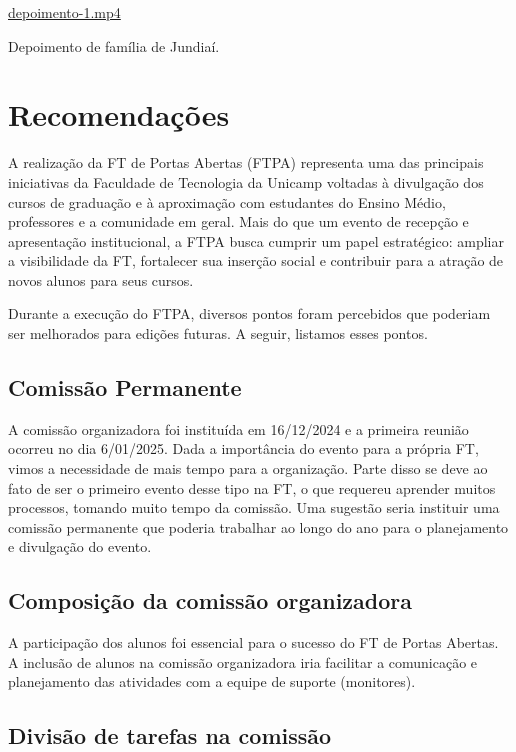 \documentclass[
  letterpaper,
  DIV=11,
  numbers=noendperiod]{scrreprt}
\begin{document}
\url{depoimento-1.mp4}

Depoimento de família de Jundiaí.


\chapter{Recomendações}\label{recomendauxe7uxf5es}

A realização da FT de Portas Abertas (FTPA) representa uma das
principais iniciativas da Faculdade de Tecnologia da Unicamp voltadas à
divulgação dos cursos de graduação e à aproximação com estudantes do
Ensino Médio, professores e a comunidade em geral. Mais do que um evento
de recepção e apresentação institucional, a FTPA busca cumprir um papel
estratégico: ampliar a visibilidade da FT, fortalecer sua inserção
social e contribuir para a atração de novos alunos para seus cursos.

Durante a execução do FTPA, diversos pontos foram percebidos que
poderiam ser melhorados para edições futuras. A seguir, listamos esses
pontos.

\section{Comissão Permanente}\label{comissuxe3o-permanente}

A comissão organizadora foi instituída em 16/12/2024 e a primeira
reunião ocorreu no dia 6/01/2025. Dada a importância do evento para a
própria FT, vimos a necessidade de mais tempo para a organização. Parte
disso se deve ao fato de ser o primeiro evento desse tipo na FT, o que
requereu aprender muitos processos, tomando muito tempo da comissão. Uma
sugestão seria instituir uma comissão permanente que poderia trabalhar
ao longo do ano para o planejamento e divulgação do evento.

\section{Composição da comissão
organizadora}\label{composiuxe7uxe3o-da-comissuxe3o-organizadora}

A participação dos alunos foi essencial para o sucesso do FT de Portas
Abertas. A inclusão de alunos na comissão organizadora iria facilitar a
comunicação e planejamento das atividades com a equipe de suporte
(monitores).

\section{Divisão de tarefas na
comissão}\label{divisuxe3o-de-tarefas-na-comissuxe3o}
\end{document}
